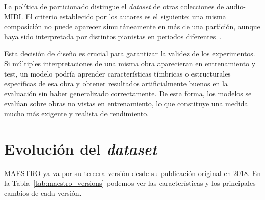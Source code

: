 \documentclass[11pt,spanish,listoffigures,listoftables]{tfgetsinf}
\begin{document}
La política de particionado distingue el \textit{dataset} de otras colecciones de audio-MIDI. El criterio establecido
por los autores es el siguiente: una misma composición no puede aparecer simultáneamente en más de una partición, aunque haya sido interpretada por distintos pianistas
en periodos diferentes~\cite{magenta2020maestrov3}.

Esta decisión de diseño es crucial para garantizar la validez de los experimentos. Si múltiples interpretaciones de una misma obra aparecieran en entrenamiento y test,
un modelo podría aprender características tímbricas o estructurales específicas de esa obra y obtener resultados artificialmente buenos en la evaluación sin haber generalizado
correctamente. De esta forma, los modelos se evalúan sobre obras no vistas en entrenamiento, lo que constituye una medida mucho más exigente y realista de rendimiento.



\section{Evolución del \textit{dataset}}
\label{sec:maestro_evolucion}
MAESTRO ya va por su tercera versión desde su publicación original en 2018. En la Tabla~\ref{tab:maestro_versions} podemos ver las características y los principales cambios de cada versión.

  \begin{table}[h]
    \centering
    \caption[Evolución de MAESTRO entre las versiones V1, V2 y V3]{%
      Comparativa de las tres versiones publicadas de MAESTRO.}
    \label{tab:maestro_versions}
    
  \end{table}
\end{document}
